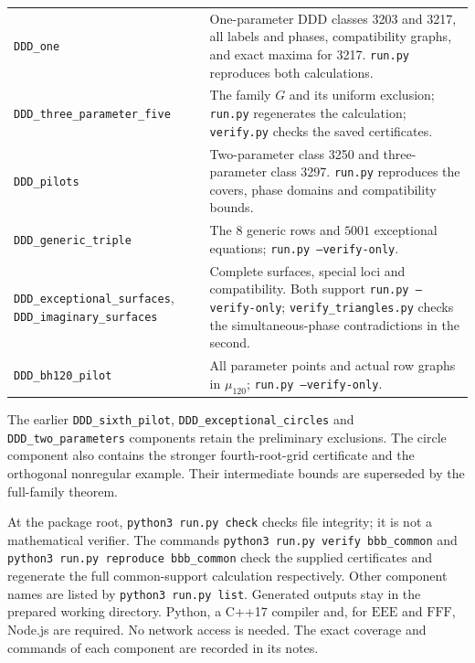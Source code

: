 \documentclass[11pt,a4paper]{article}
\theoremstyle{plain}
\theoremstyle{definition}
\theoremstyle{plain}
\begin{document}
\begin{center}
\begin{tabular}{@{}>{\raggedright\arraybackslash}p{}>{\raggedright\arraybackslash}p{}@{}}
\texttt{DDD\_one}&One-parameter $\mathrm{DDD}$ classes 3203 and 3217, all labels and phases, compatibility graphs, and exact maxima for 3217. \texttt{run.py} reproduces both calculations.\\
\texttt{DDD\_three\_parameter\_five}&The family $G$ and its uniform exclusion; \texttt{run.py} regenerates the calculation; \texttt{verify.py} checks the saved certificates.\\
\texttt{DDD\_pilots}&Two-parameter class 3250 and three-parameter class 3297. \texttt{run.py} reproduces the covers, phase domains and compatibility bounds.\\
\texttt{DDD\_generic\_triple}&The $8$ generic rows and $5001$ exceptional equations; \texttt{run.py --verify-only}.\\
\texttt{DDD\_exceptional\_surfaces}, \texttt{DDD\_imaginary\_surfaces}&Complete surfaces, special loci and compatibility. Both support \texttt{run.py --verify-only}; \texttt{verify\_triangles.py} checks the simultaneous-phase contradictions in the second.\\
\texttt{DDD\_bh120\_pilot}&All parameter points and actual row graphs in $\mu_{120}$; \texttt{run.py --verify-only}.\\
\bottomrule
\end{tabular}
\end{center}

The earlier \texttt{DDD\_sixth\_pilot}, \texttt{DDD\_exceptional\_circles} and \texttt{DDD\_two\_parameters} components retain the preliminary exclusions. The circle component also contains the stronger fourth-root-grid certificate and the orthogonal nonregular example. Their intermediate bounds are superseded by the full-family theorem.

At the package root, \texttt{python3 run.py check} checks file integrity; it is not a mathematical verifier. The commands \texttt{python3 run.py verify bbb\_common} and \texttt{python3 run.py reproduce bbb\_common} check the supplied certificates and regenerate the full common-support calculation respectively. Other component names are listed by \texttt{python3 run.py list}. Generated outputs stay in the prepared working directory. Python, a C++17 compiler and, for $\mathrm{EEE}$ and $\mathrm{FFF}$, Node.js are required. No network access is needed. The exact coverage and commands of each component are recorded in its notes.
\end{document}
